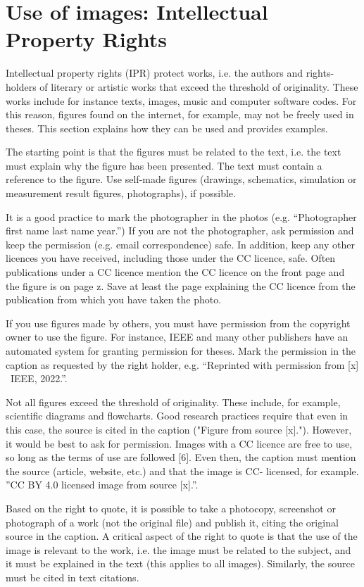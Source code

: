 \section{Use of images: Intellectual Property Rights}
\label{copyright}
Intellectual property rights (IPR) protect works, i.e. the authors and rights-holders of literary or
artistic works that exceed the threshold of originality. These works include for instance texts,
images, music and computer software codes. For this reason, figures found on the internet, for
example, may not be freely used in theses. This section explains how they can be used and
provides examples.

The starting point is that the figures must be related to the text, i.e. the text must explain why
the figure has been presented. The text must contain a reference to the figure.
Use self-made figures (drawings, schematics, simulation or measurement result figures,
photographs), if possible.

It is a good practice to mark the photographer in the photos (e.g. “Photographer first name
last name year.”) If you are not the photographer, ask permission and keep the permission (e.g.
email correspondence) safe. In addition, keep any other licences you have received, including
those under the CC licence, safe. Often publications under a CC licence mention the CC licence
on the front page and the figure is on page z. Save at least the page explaining the CC licence
from the publication from which you have taken the photo.

If you use figures made by others, you must have permission from the copyright owner to
use the figure. For instance, IEEE and many other publishers have an automated system for
granting permission for theses. Mark the permission in the caption as requested by the right
holder, e.g. “Reprinted with permission from [x] \textcopyright\ IEEE, 2022.”.

Not all figures exceed the threshold of originality. These include, for example, scientific
diagrams and flowcharts. Good research practices require that even in this case, the source is
cited in the caption ("Figure from source [x]."). However, it would be best to ask for permission.
Images with a CC licence are free to use, so long as the terms of use are followed [6]. Even
then, the caption must mention the source (article, website, etc.) and that the image is CC-
licensed, for example. ”CC BY 4.0 licensed image from source [x].”.

Based on the right to quote, it is possible to take a photocopy, screenshot or photograph of a
work (not the original file) and publish it, citing the original source in the caption. A critical
aspect of the right to quote is that the use of the image is relevant to the work, i.e. the image
must be related to the subject, and it must be explained in the text (this applies to all images).
Similarly, the source must be cited in text citations.

